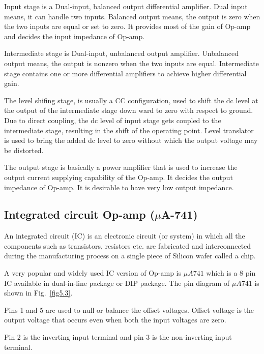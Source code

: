 Input stage is a Dual-input, balanced output differential amplifier. Dual input means, it can handle two inputs. Balanced output means, the output is zero when the two inputs are equal or set to zero. It provides most of the gain of Op-amp and decides the input impedance of Op-amp.

Intermediate stage is Dual-input, unbalanced output amplifier. Unbalanced output means, the output is nonzero when the two inputs are equal. Intermediate stage contains one or more differential amplifiers to achieve higher differential gain.

The level shifing stage, is usually a CC configuration, used to shift the dc level at the output of the intermediate stage down ward to zero with respect to ground. Due to direct coupling, the dc level of input stage gets coupled to the intermediate stage, resulting in the shift of the operating point. Level translator is used to bring the added dc level to zero without which the output voltage may be distorted.

The output stage is basically a power amplifier that is used to increase the output current supplying capability of the Op-amp. It decides the output impedance of Op-amp. It is desirable to have very low output impedance.

\subsection[Integrated circuit Op-amp ($\mu$A741)]{Integrated circuit Op-amp (\boldmath$\mu$A-741)}\label{sec5.1.5}

An integrated circuit (IC) is an electronic circuit (or system) in which all the components such as transistors, resistors etc. are fabricated and interconnected during the manufacturing process on a single piece of Silicon wafer called a chip.

A very popular and widely used IC version of Op-amp is $\mu A741$ which is a 8 pin IC available in dual-in-line package or DIP package. The pin diagram of $\mu A741$ is shown in Fig.~\ref{fig5.3}.

Pins 1 and 5 are used to null or balance the offset voltages. Offset voltage is the output voltage that occurs even when both the input voltages are zero.

Pin 2 is the inverting input terminal and pin 3 is the non-inverting input terminal.

